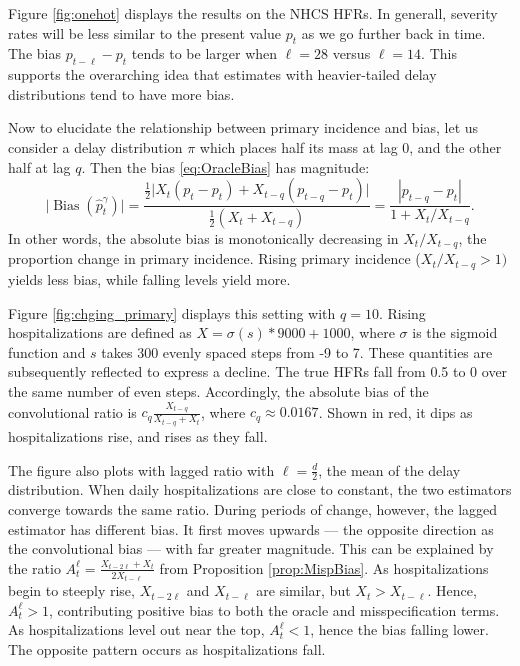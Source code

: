 \documentclass{article}
\renewcommand{\hat}{\widehat} %
\DeclareMathOperator{\bias}{Bias}
\begin{document}
Figure \ref{fig:onehot} displays the results on the NHCS HFRs.
In generall, severity rates will be less similar to the present value $p_t$ as we go further back in time. The bias $p_{t-\ell}-p_t$ tends to be larger when $\ell=28$ versus $\ell=14$. This supports the overarching idea
that estimates with heavier-tailed delay distributions tend to have more bias.          

Now to elucidate the relationship between primary incidence and bias, let us 
consider a delay distribution $\pi$ which places half its mass at lag 0, and the
other half at lag $q$. Then the bias \eqref{eq:OracleBias} has magnitude:
\[
\big| \bias(\hat{p}_t^{\gamma}) \big| = \frac{\frac{1}{2} \big| X_t(p_t-p_t) +
  X_{t-q}(p_{t-q}-p_t) \big|} {\frac{1}{2}(X_t+X_{t-q})} = \frac{|p_{t-q}-p_t|}
{1 + X_t / X_{t-q}}. 
\]
In other words, the absolute bias is monotonically decreasing in
$X_t / X_{t-q}$, the proportion change in primary incidence. Rising  
primary incidence ($X_t / X_{t-q} > 1)$ yields less bias, while falling 
levels yield more. 

Figure \ref{fig:chging_primary} displays this setting with $q=10$. Rising hospitalizations are
defined as \mbox{$X = \sigma(s)*9000+1000$}, where $\sigma$ is the sigmoid function
and $s$ takes 300 evenly spaced steps from -9 to 7. These quantities are subsequently reflected to express a decline.
The true HFRs fall from
0.5 to 0 over the same number of even steps. 
Accordingly, the absolute bias of the convolutional ratio is $c_q\frac{X_{t-q}}{X_{t-q}+X_t}$, where $c_q\approx 0.0167$. Shown in red, it dips as hospitalizations rise, and rises as they fall.  

The figure also plots with lagged ratio with $\ell=\frac{d}{2}$, the mean of
the delay distribution. When daily hospitalizations are close to constant, the
two estimators converge towards the same ratio. During periods of change,
however, the lagged estimator has different bias. It first moves upwards ---
the opposite direction as the convolutional bias --- with far greater
magnitude. This can be explained by the ratio $A_t^\ell =
\frac{X_{t-2\ell}+X_t}{2X_{t-\ell}}$ from Proposition \ref{prop:MispBias}. As
hospitalizations begin to steeply rise, $X_{t-2\ell}$ and $X_{t-\ell}$ are
similar, but $X_t > X_{t-\ell}$. Hence, $A_t^\ell>1$, contributing positive
bias to both the oracle and misspecification terms. As hospitalizations level
out near the top, $A_t^\ell < 1$, hence the bias falling lower. The opposite
pattern occurs as hospitalizations fall.  
\end{document}
